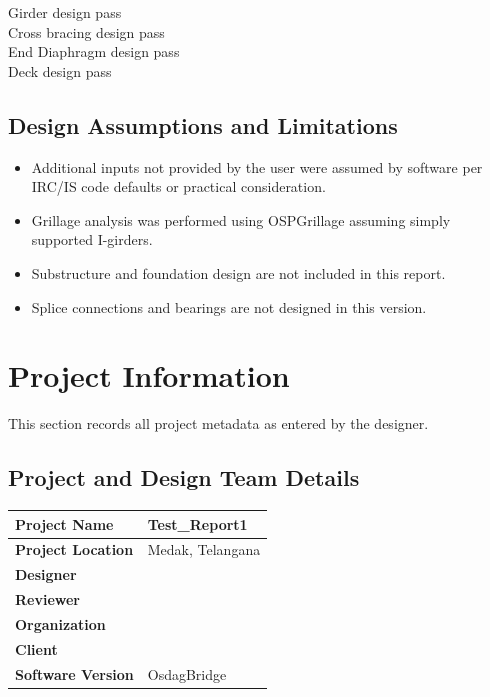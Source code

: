\documentclass[12pt,a4paper]{report}
\numberwithin{table}{chapter}
\numberwithin{figure}{chapter}
\begin{document}
\noindent Girder design pass \\
Cross bracing design pass \\
End Diaphragm design pass \\
Deck design pass

\section*{Design Assumptions and Limitations}
\label{sec:assumptions}

\begin{itemize}
\item Additional inputs not provided by the user were assumed by software per IRC/IS code defaults or practical consideration.
\item Grillage analysis was performed using OSPGrillage assuming simply supported I-girders.
\item Substructure and foundation design are not included in this report.
\item Splice connections and bearings are not designed in this version.
\end{itemize}

\titleformat{\chapter}[block]{\normalfont\Large\bfseries\centering}{\thechapter}{1em}{}
\titlespacing*{\chapter}{0pt}{-30pt}{10pt}


\chapter{Project Information}

This section records all project metadata as entered by the designer.

\section{Project and Design Team Details}
\label{sec:project-details}

\begin{tabular}{|L{5.5cm}|L{8.5cm}|}
\hline
\textbf{Project Name} & Test\_\allowbreak{}Report1 \\
\hline
\textbf{Project Location} & Medak, Telangana \\
\hline
\textbf{Designer} &  \\
\hline
\textbf{Reviewer} &  \\
\hline
\textbf{Organization} &  \\
\hline
\textbf{Client} &  \\
\hline
\textbf{Software Version} & OsdagBridge \\
\hline
\end{tabular}
\end{document}
